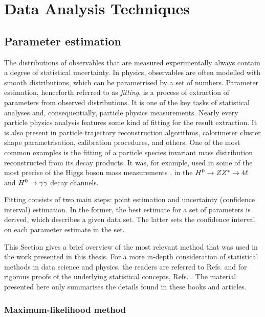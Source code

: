 \chapter{Data Analysis Techniques}\label{ch:analysis_techniques}

\section{Parameter estimation}\label{sec:fitting_theory}

The distributions of observables that are measured experimentally always contain a degree of statistical uncertainty.
In physics, observables are often modelled with smooth distributions, which can be parametrised by a set of numbers. 
Parameter estimation, henceforth referred to as \textit{fitting}, is a process of extraction of parameters from observed distributions. 
It is one of the key tasks of statistical analyses and, consequentially, particle physics measurements. 
Nearly every particle physics analysis features some kind of fitting for the result extraction. 
It is also present in particle trajectory reconstruction algorithms, calorimeter cluster shape parametrisation, calibration procedures, and others.
One of the most common examples is the fitting of a particle species invariant mass distribution reconstructed from its decay products.
It was, for example, used in some of the most precise of the Higgs boson mass measurements \cite{ATLAS:2018tdk,CMS:2020xrn}, in the $H^0\rightarrow ZZ^{*}\rightarrow 4\ell$ and $H^0\rightarrow\gamma\gamma$ decay channels.

Fitting consists of two main steps: point estimation and uncertainty (confidence interval) estimation. 
In the former, the best estimate for a set of parameters is derived, which describes a given data set.
The latter sets the confidence interval on each parameter estimate in the set. 

This Section gives a brief overview of the most relevant method that was used in the work presented in this thesis. 
For a more in-depth consideration of statistical methods in data science and physics, the readers are referred to Refs. \cite{Behnke:2013pga,Blobel_Lohrmann_1998} and for rigorous proofs of the underlying statistical concepts, Refs. \cite{Bohm:2014vmk,James_2006,Barlow:1990vc}. 
The material presented here only summarises the details found in these books and articles.

\subsection{Maximum-likelihood method}\label{sec:mle}

